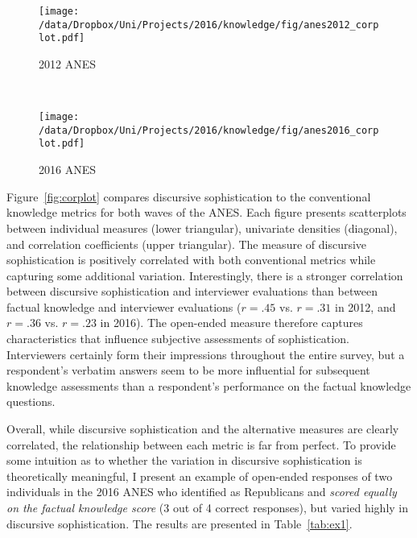\begin{figure*}[h]
    \centering
    \begin{subfigure}[t]{0.5\textwidth}
        \centering
        \texttt{[image: /data/Dropbox/Uni/Projects/2016/knowledge/fig/anes2012\_corplot.pdf]}
        \caption{2012 ANES}
    \end{subfigure}%
    ~ 
    \begin{subfigure}[t]{0.5\textwidth}
        \centering
        \texttt{[image: /data/Dropbox/Uni/Projects/2016/knowledge/fig/anes2016\_corplot.pdf]}
        \caption{2016 ANES}
    \end{subfigure}
    \caption[Correlation matrix of discursive sophistication and conventional political knowledge metrics]{Correlation matrix of discursive sophistication and conventional political knowledge metrics. The plots on the diagonal display univariate densities for each variable. The panels in the lower triangular display the scatter plot of two measures as well as a linear fit. The upper triangular displays the correlation coefficient. All correlations reported are statistically significant with $p<.05$.}\label{fig:corplot}
\end{figure*}

Figure~\ref{fig:corplot} compares discursive sophistication to the conventional knowledge metrics for both waves of the ANES. Each figure presents scatterplots between individual measures (lower triangular), univariate densities (diagonal), and correlation coefficients (upper triangular). The measure of discursive sophistication is positively correlated with both conventional metrics while capturing some additional variation. Interestingly, there is a stronger correlation between discursive sophistication and interviewer evaluations than between factual knowledge and interviewer evaluations ($r=.45$ vs. $r=.31$ in 2012, and $r=.36$ vs. $r=.23$ in 2016). The open-ended measure therefore captures characteristics that influence subjective assessments of sophistication. Interviewers certainly form their impressions throughout the entire survey, but a respondent's verbatim answers seem to be more influential for subsequent knowledge assessments than a respondent's performance on the factual knowledge questions.

Overall, while discursive sophistication and the alternative measures are clearly correlated, the relationship between each metric is far from perfect. To provide some intuition as to whether the variation in discursive sophistication is theoretically meaningful, I present an example of open-ended responses of two individuals in the 2016 ANES who identified as Republicans and \textit{scored equally on the factual knowledge score} (3 out of 4 correct responses), but varied highly in discursive sophistication. The results are presented in Table~\ref{tab:ex1}.

